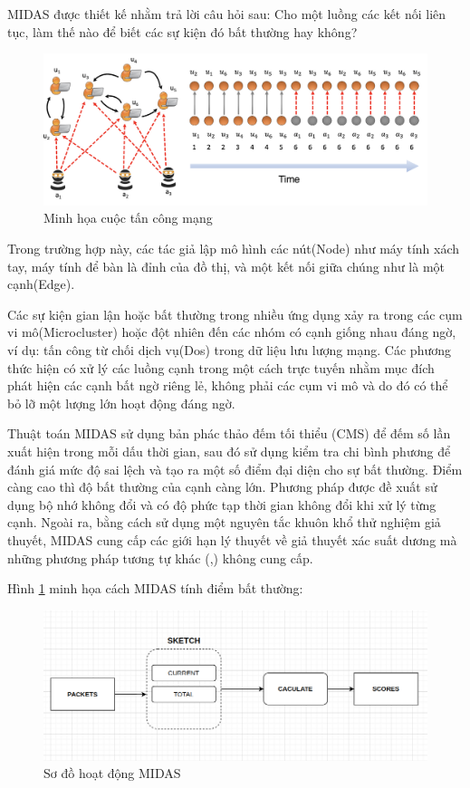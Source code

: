 MIDAS được thiết kế nhằm trả lời câu hỏi sau:
Cho một luồng các kết nối liên tục, làm thế nào để biết các sự kiện đó
bất thường hay không?

\begin{figure}[h]
    \centering
    \includegraphics[width=1.0\textwidth]{figures/Intro.png}
    \caption{Minh họa cuộc tấn công mạng}
    \label{fig:2}
\end{figure}

Trong trường hợp này, các tác giả lập mô hình các nút(Node)
như máy tính xách tay, máy tính để bàn là
đỉnh của đồ thị, và một kết nối giữa chúng như là một cạnh(Edge).

Các sự kiện gian lận hoặc bất thường trong nhiều ứng dụng xảy ra trong các cụm vi mô(Microcluster) hoặc
đột nhiên đến các nhóm có cạnh giống nhau đáng ngờ, ví dụ: tấn công từ chối dịch vụ(Dos)
trong dữ liệu lưu lượng mạng. Các phương thức hiện có xử lý các luồng cạnh trong
một cách trực tuyến nhằm mục đích phát hiện các cạnh bất ngờ riêng lẻ, không phải các cụm vi mô và
do đó có thể bỏ lỡ một lượng lớn hoạt động đáng ngờ.


Thuật toán MIDAS sử dụng bản phác thảo đếm tối thiểu (CMS) để đếm số lần xuất hiện trong mỗi
dấu thời gian, sau đó sử dụng kiểm tra chi bình phương để đánh giá mức độ sai lệch và
tạo ra một số điểm đại diện cho sự bất thường. Điểm càng cao thì độ bất thường
của cạnh càng lớn. Phương pháp được đề xuất sử dụng bộ nhớ không đổi và
có độ phức tạp thời gian không đổi khi xử lý từng cạnh. Ngoài ra, bằng cách sử dụng một nguyên tắc
khuôn khổ thử nghiệm giả thuyết, MIDAS cung cấp các giới hạn lý thuyết về giả thuyết
xác suất dương mà những phương pháp tương tự khác
(\cite{related1},\cite{related2}) không cung cấp.

Hình \ref{fig:2} minh họa cách MIDAS tính điểm bất thường:
\begin{figure}[H]
    \centering
    \includegraphics[width=1.0\textwidth]{figures/midas.png}
    \caption{Sơ đồ hoạt động MIDAS}
    \label{fig:3}
\end{figure}

